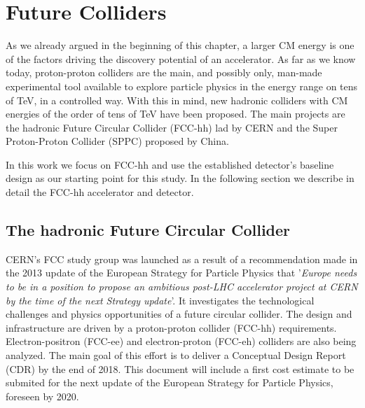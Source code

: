 \section{Future Colliders}
\label{section:future_colliders}

As we already argued in the beginning of this chapter, a larger CM energy is one of the factors driving the discovery potential of an accelerator. As far as we know today, proton-proton colliders are the main, and possibly only, man-made experimental tool available to explore particle physics in the energy range on tens of TeV, in a controlled way. With this in mind, new hadronic colliders with CM energies of the order of tens of TeV have been proposed. The main projects are the hadronic Future Circular Collider (FCC-hh) lad by CERN and the Super Proton-Proton Collider (SPPC) proposed by China. 

In this work we focus on FCC-hh and use the established detector's baseline design as our starting point for this study. In the following section we describe in detail the FCC-hh accelerator and detector.

\subsection{The hadronic Future Circular Collider}
\label{section:FCC}

%

CERN's FCC study group was launched as a result of a recommendation made in the  2013 update of the European Strategy for Particle Physics that '\textit{Europe needs to be in a position to propose an ambitious post-LHC accelerator project at CERN by the time of the next Strategy update}'. It investigates the technological challenges and physics opportunities of a future circular collider. The design and infrastructure are driven by a proton-proton collider (FCC-hh) requirements. Electron-positron (FCC-ee) and electron-proton (FCC-eh) colliders are also being analyzed. The main goal of this effort is to deliver a Conceptual Design Report (CDR) by the end of 2018. This document will include a first cost estimate to be submited for the next update of the European Strategy for Particle Physics, foreseen by 2020.

